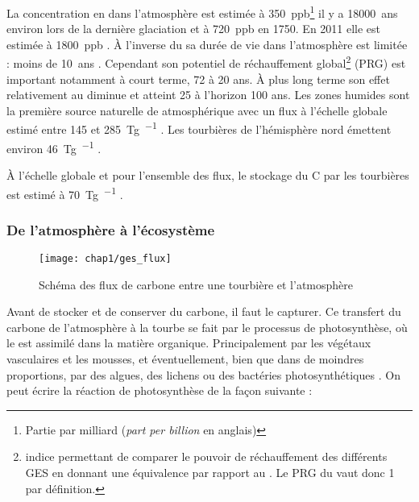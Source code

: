 La concentration en \chh dans l'atmosphère est estimée à \SI{350}{ppb}\footnote{Partie par milliard (\textit{part per billion} en anglais)} il y a \SI{18000}{ans} environ lors de la dernière glaciation et à \SI{720}{ppb} en 1750.
En 2011 elle est estimée à \SI{1800}{ppb} \citep{Ciais2014}.
À l'inverse du \coo sa durée de vie dans l'atmosphère est limitée : moins de \SI{10}{ans} \citep{lelieveld1998,prather2012}.
Cependant son potentiel de réchauffement global\footnote{indice permettant de comparer le pouvoir de réchauffement des différents GES en donnant une équivalence par rapport au \coo. Le PRG du \coo vaut donc 1 par définition.} (PRG) est important notamment à court terme, 72 à 20 ans.
À plus long terme son effet relativement au \coo diminue et atteint 25 à l'horizon 100 ans.
Les zones humides sont la première source naturelle de \chh atmosphérique avec un flux à l'échelle globale estimé entre \num{145} et \SI{285}{\tera\gram\per\year} \citep{lelieveld1998,wuebbles2002,Ciais2014}. %
Les tourbières de l'hémisphère nord émettent environ \SI{46}{\tera\gram\per\year} \citep{gorham1991}. %


À l'échelle globale et pour l'ensemble des flux, le stockage du C par les tourbières est estimé à \SI{70}{\tera\gram\per\year} \citep{clymo1998}.


\subsubsection{De l'atmosphère à l'écosystème}

\begin{figure}
\centering
\texttt{[image: chap1/ges\_flux]}
\caption{Schéma des flux de carbone entre une tourbière et l'atmosphère}
\label{fig:ges_flux}
\end{figure}

Avant de stocker et de conserver du carbone, il faut le capturer.
Ce transfert du carbone de l'atmosphère à la tourbe se fait par le processus de photosynthèse, où le \coo est assimilé dans la matière organique.
Principalement par les végétaux vasculaires et les mousses, et éventuellement, bien que dans de moindres proportions, par des algues, des lichens ou des bactéries photosynthétiques \citep{girard2011}.
On peut écrire la réaction de photosynthèse de la façon suivante : 

